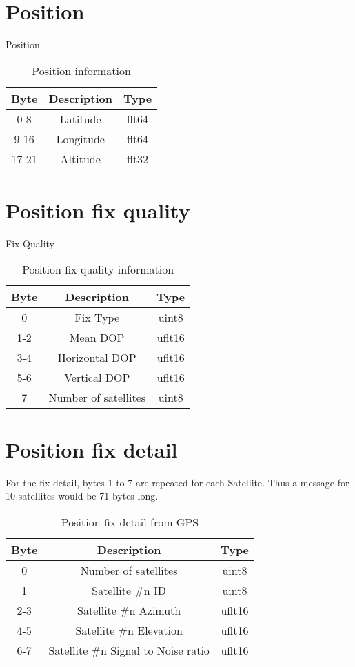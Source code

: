 \section{Position}
\label{msg003}
Position
\begin{table}[H]
  \centering
  \begin{tabular}{ c c c }
  Byte & Description & Type \\
\hline
   0-8  & Latitude  & flt64 \\
   9-16  & Longitude & flt64 \\
   17-21 & Altitude  & flt32 \\
  \end{tabular}
  \caption{Position information}
\end{table}

\section{Position fix quality}
\label{msg004}
Fix Quality
\begin{table}[H]
  \centering
  \begin{tabular}{ c c c }
  Byte & Description & Type \\
\hline
    0  & Fix Type             & uint8  \\
   1-2 & Mean DOP             & uflt16 \\
   3-4 & Horizontal DOP       & uflt16 \\
   5-6 & Vertical DOP         & uflt16 \\
    7  & Number of satellites & uint8  \\
  \end{tabular}
  \caption{Position fix quality information}
\end{table}

\section{Position fix detail}
\label{msg005}
For the fix detail, bytes 1 to 7 are repeated for each Satellite. Thus a message for 10 satellites would be 71 bytes long. 

\begin{table}[H]
  \centering
  \begin{tabular}{ c c c }
  Byte & Description & Type \\
\hline
    0  & Number of satellites               & uint8  \\
    1  & Satellite \#n ID                   & uint8  \\
   2-3 & Satellite \#n Azimuth               & uflt16 \\
   4-5 & Satellite \#n Elevation             & uflt16 \\
   6-7 & Satellite \#n Signal to Noise ratio & uflt16 \\
  \end{tabular}
  \caption{Position fix detail from GPS}
\end{table}


